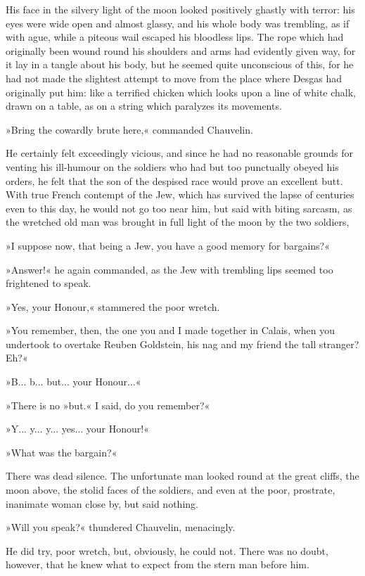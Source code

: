 His face in the silvery light of the moon looked positively ghastly with terror: his eyes were wide open and almost glassy, and his whole body was trembling, as if with ague, while a piteous wail escaped his bloodless lips. The rope which had originally been wound round his shoulders and arms had evidently given way, for it lay in a tangle about his body, but he seemed quite unconscious of this, for he had not made the slightest attempt to move from the place where Desgas had originally put him: like a terrified chicken which looks upon a line of white chalk, drawn on a table, as on a string which paralyzes its movements.

»Bring the cowardly brute here,« commanded Chauvelin.

He certainly felt exceedingly vicious, and since he had no reasonable grounds for venting his ill-humour on the soldiers who had but too punctually obeyed his orders, he felt that the son of the despised race would prove an excellent butt. With true French contempt of the Jew, which has survived the lapse of centuries even to this day, he would not go too near him, but said with biting sarcasm, as the wretched old man was brought in full light of the moon by the two soldiers,\longdash


»I suppose now, that being a Jew, you have a good memory for bargains?«

»Answer!« he again commanded, as the Jew with trembling lips seemed too frightened to speak.

»Yes, your Honour,« stammered the poor wretch.

»You remember, then, the one you and I made together in Calais, when you undertook to overtake Reuben Goldstein, his nag and my friend the tall stranger? Eh?«

»B... b... but... your Honour...«

»There is no »but.« I said, do you remember?«

»Y... y... y... yes... your Honour!«

»What was the bargain?«

There was dead silence. The unfortunate man looked round at the great cliffs, the moon above, the stolid faces of the soldiers, and even at the poor, prostrate, inanimate woman close by, but said nothing.

»Will you speak?« thundered Chauvelin, menacingly.

He did try, poor wretch, but, obviously, he could not. There was no doubt, however, that he knew what to expect from the stern man before him.

